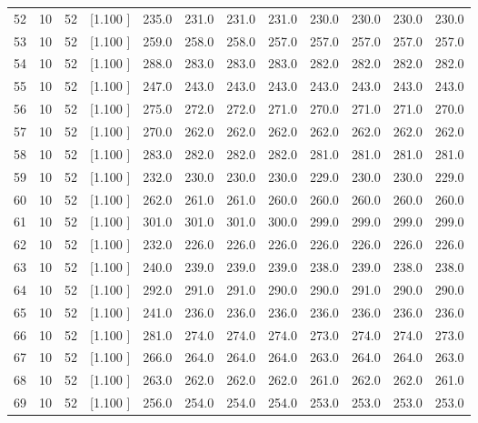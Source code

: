 \documentclass[12pt,a4paper]{article}
\begin{document}
\begin{center}
{\begin{tabular}{r r r r r r r r r r r r}
  52& 10& 52&[1.100     ]&   235.0&   231.0&   231.0&   231.0&   230.0&   230.0&   230.0&   230.0\\[-0.02in]
  53& 10& 52&[1.100     ]&   259.0&   258.0&   258.0&   257.0&   257.0&   257.0&   257.0&   257.0\\[-0.02in]
  54& 10& 52&[1.100     ]&   288.0&   283.0&   283.0&   283.0&   282.0&   282.0&   282.0&   282.0\\[-0.02in]
  55& 10& 52&[1.100     ]&   247.0&   243.0&   243.0&   243.0&   243.0&   243.0&   243.0&   243.0\\[-0.02in]
  56& 10& 52&[1.100     ]&   275.0&   272.0&   272.0&   271.0&   270.0&   271.0&   271.0&   270.0\\[-0.02in]
  57& 10& 52&[1.100     ]&   270.0&   262.0&   262.0&   262.0&   262.0&   262.0&   262.0&   262.0\\[-0.02in]
  58& 10& 52&[1.100     ]&   283.0&   282.0&   282.0&   282.0&   281.0&   281.0&   281.0&   281.0\\[-0.02in]
  59& 10& 52&[1.100     ]&   232.0&   230.0&   230.0&   230.0&   229.0&   230.0&   230.0&   229.0\\[-0.02in]
  60& 10& 52&[1.100     ]&   262.0&   261.0&   261.0&   260.0&   260.0&   260.0&   260.0&   260.0\\[-0.02in]
  61& 10& 52&[1.100     ]&   301.0&   301.0&   301.0&   300.0&   299.0&   299.0&   299.0&   299.0\\[-0.02in]
  62& 10& 52&[1.100     ]&   232.0&   226.0&   226.0&   226.0&   226.0&   226.0&   226.0&   226.0\\[-0.02in]
  63& 10& 52&[1.100     ]&   240.0&   239.0&   239.0&   239.0&   238.0&   239.0&   238.0&   238.0\\[-0.02in]
  64& 10& 52&[1.100     ]&   292.0&   291.0&   291.0&   290.0&   290.0&   291.0&   290.0&   290.0\\[-0.02in]
  65& 10& 52&[1.100     ]&   241.0&   236.0&   236.0&   236.0&   236.0&   236.0&   236.0&   236.0\\[-0.02in]
  66& 10& 52&[1.100     ]&   281.0&   274.0&   274.0&   274.0&   273.0&   274.0&   274.0&   273.0\\[-0.02in]
  67& 10& 52&[1.100     ]&   266.0&   264.0&   264.0&   264.0&   263.0&   264.0&   264.0&   263.0\\[-0.02in]
  68& 10& 52&[1.100     ]&   263.0&   262.0&   262.0&   262.0&   261.0&   262.0&   262.0&   261.0\\[-0.02in]
  69& 10& 52&[1.100     ]&   256.0&   254.0&   254.0&   254.0&   253.0&   253.0&   253.0&   253.0\\[-0.02in]

\end{tabular}}
\end{center}
\end{document}
